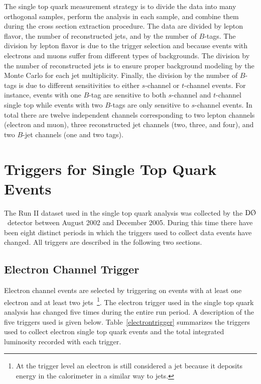 The single top quark measurement strategy is to divide the data into many orthogonal samples, perform the analysis in each sample, and combine them during the cross section extraction procedure. The data are divided by lepton flavor, the number of reconstructed jets, and by the number of $B$-tags. The division by lepton flavor is due to the trigger selection and because events with electrons and muons suffer from different types of backgrounds. The division by the number of reconstructed jets is to ensure proper background modeling by the Monte Carlo for each jet multiplicity. Finally, the division by the number of $B$-tags is due to different sensitivities to either $s$-channel or $t$-channel events. For instance, events with one $B$-tag are sensitive to both $s$-channel and $t$-channel single top while events with two $B$-tags are only sensitive to $s$-channel events. In total there are twelve independent channels corresponding to two lepton channels (electron and muon), three reconstructed jet channels (two, three, and four), and two $B$-jet channels (one and two tags).

\section{Triggers for Single Top Quark Events}
\label{datasample}

The Run II dataset used in the single top quark analysis was collected by the $\dzero$~detector between August 2002 and December 2005. During this time there have been eight distinct periods in which the triggers used to collect data events have changed. All triggers are described in the following two sections.

\subsection{Electron Channel Trigger}
Electron channel events are selected by triggering on events with at least one electron and at least two jets~\footnote{At the trigger level an electron is still considered a jet because it deposits energy in the calorimeter in a similar way to jets.}. The electron trigger used in the single top quark analysis has changed five times during the entire run period. A description of the five triggers used is given below. Table~\ref{electrontrigger} summarizes the triggers used to collect electron single top quark events and the total integrated luminosity recorded with each trigger.

